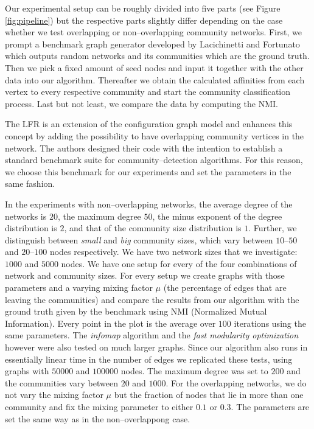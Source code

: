Our experimental setup can be roughly divided into five parts (see Figure \ref{fig:pipeline}) but the respective parts slightly differ depending on the case whether we test overlapping or non--overlapping community networks. First, we prompt a benchmark graph generator developed by Lacichinetti and Fortunato which outputs random networks and its communities which are the 
ground truth. Then we pick a fixed amount of seed nodes and input it together 
with the other data into our algorithm. Thereafter we obtain the calculated 
affinities from each vertex to every respective community and start the 
community classification process. Last but not least, we compare the data by 
computing the NMI\cite{DDDA05}.

The LFR is an extension of the configuration graph model and enhances this concept by adding the possibility to have overlapping community vertices in the network. The authors designed their code with the intention to establish a standard benchmark suite for community--detection algorithms. For this reason, we choose this benchmark for our experiments and set the parameters in the same fashion. 

In the experiments with non--overlapping networks, the average degree of the networks is $20$, the maximum degree $50$, the minus exponent of the degree distribution is $2$, and that of the community size distribution is $1$. Further, we distinguish between \textit{small} and \textit{big} community sizes, which vary between $10$--$50$ and $20$--$100$ nodes respectively. We have two network sizes that we investigate: $1000$ and $5000$ nodes. We have one setup for every of the four combinations of network and community sizes. For every setup we create graphs with those parameters and a varying mixing factor $\mu$ (the percentage of edges that are leaving the communities) and compare the results from our algorithm with the ground truth given by the benchmark using NMI (Normalized Mutual Information). Every point in the plot is the average over $100$ iterations using the same parameters. The \textit{infomap} algorithm \cite{RB08} and the \textit{fast modularity optimization} \cite{BGLL08} however were also tested on much larger graphs. Since our algorithm also runs in essentially linear time in the number of edges we replicated these tests, using graphs with $50000$ and $100000$ nodes. The maximum degree was set to $200$ and the communities vary between $20$ and $1000$. For the overlapping networks, we do not vary the mixing factor $\mu$ but the fraction of nodes that lie in more than one community and fix the mixing parameter to either $0.1$ or $0.3$. The parameters are set the same way as in the non--overlappong case.

